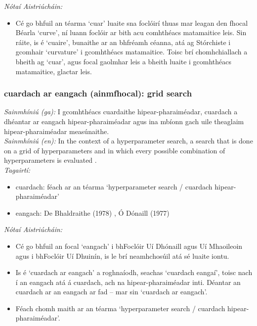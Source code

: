  \noindent \textit{Nótaí Aistriúcháin:}
\begin{itemize}
	\item Cé go bhfuil an téarma `cuar' luaite sna foclóirí thuas mar leagan den fhocal Béarla `curve', ní luann foclóir ar bith acu comhthéacs matamaitice leis. Sin ráite, is é `cuaire', bunaithe ar an bhfréamh céanna, atá ag Stórchiste i gcomhair `curvature' i gcomhthéacs matamaitice. Toisc brí chomhchiallach a bheith ag `cuar', agus focal gaolmhar leis a bheith luaite i gcomhthéacs matamaitice, glactar leis.
\end{itemize}


\subsubsection*{cuardach ar eangach (ainmfhocal): grid search}
 \noindent \textit{Sainmhíniú (ga):} I gcomhthéacs cuardaithe hipear-pharaiméadar, cuardach a dhéantar ar eangach hipear-pharaiméadar agus ina mbíonn gach uile theaglaim hipear-pharaiméadar measúnaithe.
\\
 \noindent \textit{Sainmhíniú (en):} In the context of a hyperparameter search, a search that is done on a grid of hyperparameters and in which every possible combination of hyperparameters is evaluated .
\\
 \noindent \textit{Tagairtí:}
\begin{itemize}
	\item cuardach: féach ar an téarma `hyperparameter search / cuardach hipear-pharaiméadar'
	\item eangach: De Bhaldraithe (1978) \cite{de-bhaldraithe}, Ó Dónaill (1977) \cite{odonaill}
\end{itemize}

 \noindent \textit{Nótaí Aistriúcháin:}
\begin{itemize}
	\item Cé go bhfuil an focal `eangach' i bhFoclóir Uí Dhónaill agus Uí Mhaoileoin agus i bhFoclóir Uí Dhuinín, is le brí neamhchosúil atá sé luaite iontu.
	\item Is é `cuardach ar eangach' a roghnaíodh, seachas `cuardach eangaí', toisc nach í an eangach atá á cuardach, ach na hipear-pharaiméadar inti. Déantar an cuardach ar an eangach ar fad -- mar sin `cuardach ar eangach'.
	\item Féach chomh maith ar an téarma `hyperparameter search / cuardach hipear-pharaiméadar'.
\end{itemize}



